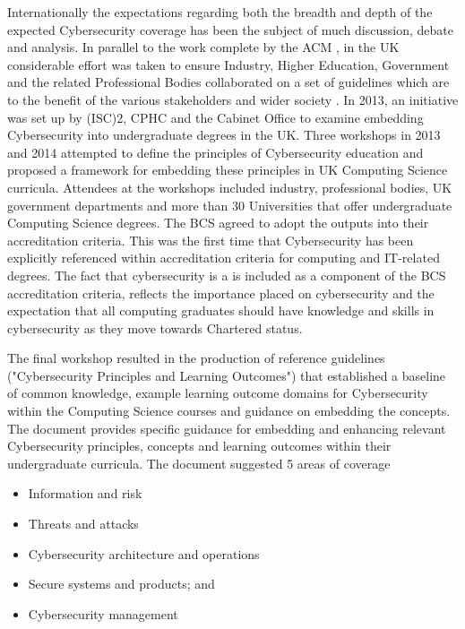 \documentclass[sigconf,anonymous]{acmart}
\begin{document}
Internationally the expectations regarding both the breadth and depth of the expected Cybersecurity coverage has been the subject of much discussion, debate and analysis. In parallel to the work complete by the ACM \cite{ACM2013a}, in the UK considerable effort was taken to ensure Industry, Higher Education, Government and the related Professional Bodies collaborated on a set of guidelines which are to the benefit of the various stakeholders and wider society \cite{Irons2016}. In 2013, an initiative was set up by (ISC)2, CPHC and the Cabinet Office to examine embedding Cybersecurity into undergraduate degrees in the UK. Three workshops in 2013 and 2014 attempted to define the principles of Cybersecurity education and proposed a framework for embedding these principles in UK Computing Science curricula. Attendees at the workshops included industry, professional bodies, UK government departments and more than 30 Universities that offer undergraduate Computing Science degrees.  The BCS agreed to adopt the outputs into their accreditation criteria. This was the first time that Cybersecurity has been explicitly referenced within accreditation criteria for computing and IT-related degrees. The fact that cybersecurity is a is included as a  component of the BCS accreditation criteria, reflects the importance placed on cybersecurity and the expectation that all computing graduates should have knowledge and skills in cybersecurity as they move towards Chartered status.

The final workshop resulted in the production of reference guidelines ("Cybersecurity Principles and Learning Outcomes") \cite{CPHCISC2} that established a baseline of common knowledge, example learning outcome domains for Cybersecurity within the Computing Science courses and guidance on embedding the concepts. The document provides specific guidance for embedding and enhancing relevant Cybersecurity principles, concepts and learning outcomes within their undergraduate curricula. The document suggested 5 areas of coverage 

\begin{itemize}
    \item Information and risk 
    \item Threats and attacks 
    \item Cybersecurity architecture and operations
    \item Secure systems and products; and 
    \item Cybersecurity management
\end{itemize}
\end{document}
